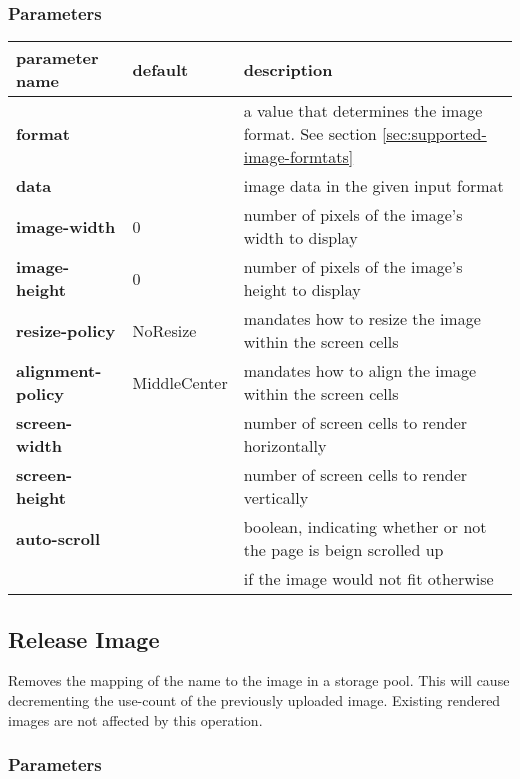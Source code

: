 \documentclass[a4paper]{article}
\begin{document}
\subsubsection*{Parameters}

\begin{tabular}{|l|l|l|}
    \hline
    \textbf{parameter name} & \textbf{default} & \textbf{description} \\
    \hline
    \textbf{format} & & a value that determines the image format. See section \ref{sec:supported-image-formtats} \\
    \textbf{data} & & image data in the given input format \\
    \textbf{image-width} & 0 & number of pixels of the image's width to display \\
    \textbf{image-height} & 0 & number of pixels of the image's height to display \\
    \textbf{resize-policy} & NoResize & mandates how to resize the image within the screen cells \\
    \textbf{alignment-policy} & MiddleCenter & mandates how to align the image within the screen cells \\
    \textbf{screen-width} & & number of screen cells to render horizontally \\
    \textbf{screen-height} & & number of screen cells to render vertically \\
    \textbf{auto-scroll} & & boolean, indicating whether or not the page is beign scrolled up \\
            & & if the image would not fit otherwise \\
    \hline
\end{tabular}


\subsection{Release Image}

Removes the mapping of the name to the image in a storage pool.
This will cause decrementing the use-count of the previously uploaded image.
Existing rendered images are not affected by this operation.

\subsubsection*{Parameters}
\end{document}
